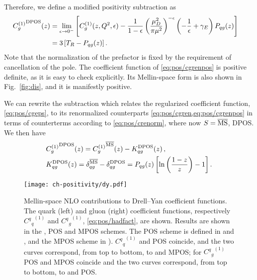 Therefore, we define a modified positivity subtraction as
\begin{align}\label{eq:pos/cgrenpos}
  \hspace*{-1em}{C^{(1)}_{g}}^{\textrm{DPOS}}(z) &= \lim_{\epsilon\to0^-}
  \left[{C^{(1)}_{g}}(z,Q^2,\epsilon) - \frac{1}{1-\epsilon}\left(\frac{\mu_D^2}{\pi\mu^2}\right)^{-\epsilon} \left(-\frac 1
    {\epsilon}+\gamma_E\right) P_{qg}(z)\right]\\\label{eq:pos/cgrenpos1}
    &= 3\left[T_R- P_{qg}(z)\right].
\end{align}
Note that the normalization of the prefactor is fixed by the
requirement of cancellation of the pole.
The coefficient function of \cref{eq:pos/cgrenpos} is positive definite,
as it is easy to check explicitly. Its Mellin-space form is also shown
in Fig.~\ref{fig:dis}, and it is manifestly positive.

We
can rewrite the subtraction which relates  the regularized
coefficient function, \cref{eq:pos/cgeps}, to its renormalized
counterparts \cref{eq:pos/cgren,eq:pos/cgrenpos} in terms of
counterterms according to \cref{eq:pos/crenorm}, where now
$S={\overline{\textrm{MS}}}$, DPOS.
We then have 
\begin{align}\label{eq:pos/count}
  &   {C^{(1)}_{g}}^{\textrm{DPOS}}(z) =  {C^{(1)}_{g}}^{{\overline{\textrm{MS}}}}(z) -
  K_{qg}^{\textrm{DPOS}}(z) \,,\\ \label{eq:pos/count1}
  &  K_{qg}^{\textrm{DPOS}}(z)=\delta_{qg}^{{\overline{\textrm{MS}}}}-\delta_{qg}^{\textrm{DPOS}}=  P_{qg}(z)\left[\ln\left(\frac{1-z}{z}\right) - 1\right].
\end{align}


\begin{figure}[t]
  \begin{center}
    \texttt{[image: ch-positivity/dy.pdf]}
    \caption{\small Mellin-space NLO contributions to Drell--Yan coefficient
      functions. The quark (left) and gluon (right) coefficient
      functions, respectively  ${{{C^q}_q}^{(1)}}$ and  ${{{C^q}_g}^{(1)}}$, \cref{eq:pos/hadfact}, are
      shown.
      Results are shown in the \msbar{}, POS and MPOS schemes. The POS
      scheme is defined in 
      and , and the MPOS scheme
      in ).
 ${{{C^q}_q}^{(1)}}$ \msbar{} and POS coincide, and the two curves
      correspond, from top to bottom, to \msbar{} and MPOS; for  
      ${{{C^q}_g}^{(1)}}$ POS and MPOS coincide and the two curves
      correspond, from top to bottom, to \msbar{} and POS. 
    \label{fig:dy} }
  \end{center}
\end{figure}
